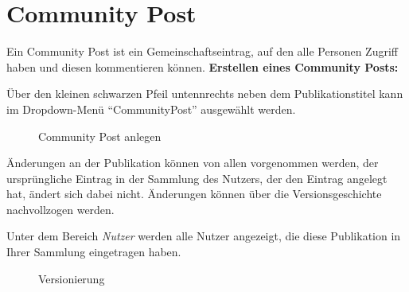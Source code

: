 \section{Community Post}
\label{sec:communityPost}
Ein Community Post ist ein Gemeinschaftseintrag, auf den alle Personen Zugriff haben und diesen kommentieren können. \newline \newline
\textbf{Erstellen eines Community Posts:}

Über den kleinen schwarzen Pfeil untennrechts neben dem Publikationstitel kann  
im Dropdown-Menü \enquote{CommunityPost} ausgewählt werden.
\begin{figure}[h!]
 \centering
 \caption{Community Post anlegen}
 \label{fig:communityPostAnlegen}
\end{figure}
Änderungen an der Publikation können von allen vorgenommen werden, der ursprüngliche Eintrag in der Sammlung des Nutzers, der den Eintrag angelegt hat, ändert sich dabei nicht. Änderungen können über die Versionsgeschichte nachvollzogen werden. 

Unter dem Bereich \textit{Nutzer} werden alle Nutzer angezeigt, die diese Publikation in Ihrer Sammlung eingetragen haben.
\begin{figure}[h!]
 \centering
 \caption{Versionierung}
 \label{fig:versionierung}
\end{figure}

